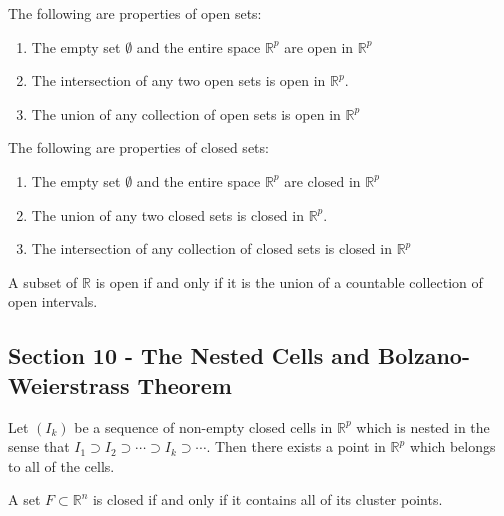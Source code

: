 \documentclass[12pt]{article}
\newenvironment{theorem}[2][Theorem]{\begin{trivlist}
\item[\hskip \labelsep {\bfseries #1}\hskip \labelsep {\bfseries #2.}]}{\end{trivlist}}
\begin{document}
\begin{theorem}[]{Open Set Properties} The following are properties of open sets:
\begin{enumerate}[label=\alph*)]
\item The empty set $\emptyset$ and the entire space $\mathbb{R}^p$ are open in $\mathbb{R}^p$
\item The intersection of any two open sets is open in $\mathbb{R}^p$.
\item The union of any collection of open sets is open in $\mathbb{R}^p$
\end{enumerate}
\end{theorem}
\newpage
\begin{theorem}[]{Closed Set Properties} The following are properties of closed sets:
\begin{enumerate}[label=\alph*)]
\item The empty set $\emptyset$ and the entire space $\mathbb{R}^p$ are closed in $\mathbb{R}^p$
\item The union of any two closed sets is closed in $\mathbb{R}^p$.
\item The intersection of any collection of closed sets is closed in $\mathbb{R}^p$
\end{enumerate}
\end{theorem}

\begin{theorem}{9.11}
A subset of $\mathbb{R}$ is open if and only if it is the union of a countable collection of open intervals.
\end{theorem}

\subsection*{Section 10 - The Nested Cells and Bolzano-Weierstrass Theorem}

\begin{theorem}[Nested Cells]{Theorem}
Let $(I_k)$ be a sequence of non-empty closed cells in $\mathbb{R}^p$ which is nested in the sense that $I_1 \supset I_2 \supset \cdots \supset I_k \supset \cdots$. Then there exists a point in $\mathbb{R}^p$ which belongs to all of the cells.
\end{theorem}

\begin{theorem}{10.5}
A set $F \subset \mathbb{R}^n$ is closed if and only if it contains all of its cluster points.
\end{theorem}
\end{document}
